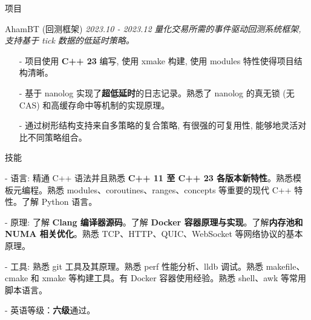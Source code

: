 \documentclass{resume} %
\begin{document}
\begin{rSection}{项目}
\begin{rSubsection}
    {AhamBT (回测框架)} {\em 2023.10 - 2023.12}
    {\textit{量化交易所需的事件驱动回测系统框架, 支持基于 tick 数据的低延时策略。}}
    {\textit{}}
    \item[]
    \begin{itemize}
        \setlength\itemsep{-0.5em}
        \item[-] 项目使用 \textbf{C++ 23} 编写, 使用 xmake 构建, 使用 modules 特性使得项目结构清晰。
        \item[-] 基于 nanolog 实现了\textbf{超低延时}的日志记录。熟悉了 nanolog 的真无锁 (无 CAS) 和高缓存命中等机制的实现原理。
        \item[-] 通过树形结构支持来自多策略的复合策略, 有很强的可复用性, 能够地灵活对比不同策略组合。
    \end{itemize}
\end{rSubsection}
\end{rSection}


\begin{rSection}{技能}
\begin{rSubsection}
{}{}{}{}
\item[-] 语言: 精通 C++ 语法并且熟悉 \textbf{C++ 11 至 C++ 23 各版本新特性}。熟悉模板元编程。熟悉 modules、coroutines、ranges、concepts 等重要的现代 C++ 特性。了解 Python 语言。
\item[-] 原理: 了解 \textbf{Clang 编译器源码}。了解 \textbf{Docker 容器原理与实现}。了解\textbf{内存池和 NUMA 相关优化}。熟悉 TCP、HTTP、QUIC、WebSocket 等网络协议的基本原理。
\item[-] 工具: 熟悉 git 工具及其原理。熟悉 perf 性能分析、lldb 调试。熟悉 makefile、cmake 和 xmake 等构建工具。有 Docker 容器使用经验。熟悉 shell、awk 等常用脚本语言。
\item[-] 英语等级：\textbf{六级}通过。
\end{rSubsection}
\end{rSection}

\end{document}
